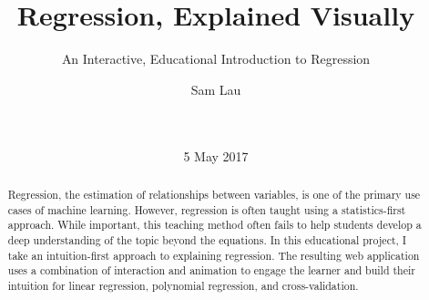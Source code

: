 \documentclass{acm_proc_article-sp}
\begin{document}
\title{Regression, Explained Visually}
\subtitle{An Interactive, Educational Introduction to Regression}

\author{
\alignauthor
Sam Lau\\
       \\
       \\
}

\date{5 May 2017}

%
%
%
%
%

\maketitle
\begin{abstract}
Regression, the estimation of relationships between variables, is one of the
primary use cases of machine learning. However, regression is often taught
using a statistics-first approach. While important, this teaching method often
fails to help students develop a deep understanding of the topic beyond the
equations. In this educational project, I take an intuition-first approach to
explaining regression. The resulting web application uses a combination of
interaction and animation to engage the learner and build their intuition for
linear regression, polynomial regression, and cross-validation.
\end{abstract}


\end{document}
